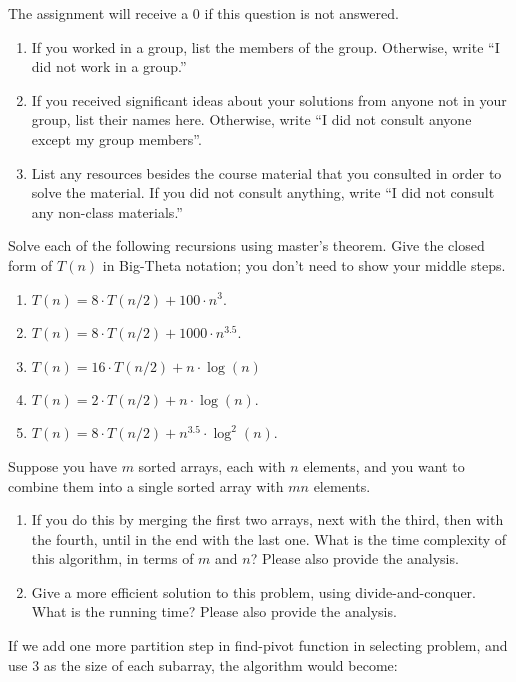 \documentclass[11pt]{article}
\begin{document}
\begin{qunlist}

	The assignment will receive a 0 if this question is not answered.
\begin{enumerate}
	\item If you worked in a group, list the members of the group. Otherwise, write ``I did not work in a group.''
	\item If you received significant ideas about your solutions from anyone not in your group, list their names here. Otherwise, write ``I did not consult  anyone except my group members''.
	\item List any resources besides the course material that you consulted in order to solve the material. If you did not consult anything, write ``I did not consult any non-class materials.''
\end{enumerate}

Solve each of the following recursions using master's theorem.
Give the closed form of $T(n)$ in Big-Theta notation; you don't need to show your middle steps.
\begin{enumerate}
\item $ T(n) = 8 \cdot T(n/2) + 100 \cdot n^3$.
\item $ T(n) = 8 \cdot T(n/2) + 1000 \cdot n^{3.5}$.
\item $ T(n) = 16 \cdot T(n/2) + n \cdot \log(n)$
\item $ T(n) = 2 \cdot T(n/2) + n \cdot \log(n)$.
\item $ T(n) = 8 \cdot T(n/2) + n^{3.5} \cdot \log^2(n)$.
\end{enumerate}

Suppose you have $m$ sorted arrays, each with $n$ elements, and you want to combine them into a single sorted array with $mn$ elements. 
\begin{enumerate}
\item If you do this by merging the first two arrays, next with the third, then with the fourth, until in the end with the last one. What is the time complexity of this algorithm, in terms of $m$ and $n$? Please also provide the analysis.
\item Give a more efficient solution to this problem, using divide-and-conquer. What is the running time? Please also provide the analysis.
\end{enumerate}

If we add one more partition step in find-pivot function in selecting problem,
and use 3 as the size of each subarray, the algorithm would become:


\end{qunlist}
\end{document}
